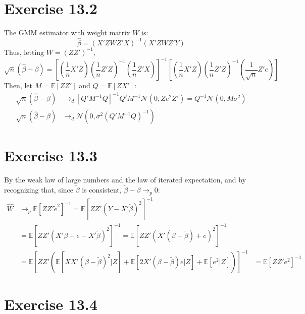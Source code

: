\documentclass{article}
\newcommand{\N}{\mathcal{N}}
\renewcommand{\tilde}[1]{\widetilde{#1}}
\newcommand{\tb}{\tilde{\beta}}
\newcommand{\bhat}{\hat{\beta}}
\newcommand{\E}[1]{\mathbb{E}\left[#1\right]}%
\begin{document}
\pagebreak
\section*{Exercise 13.2}
The GMM estimator with weight matrix $W$ is:
\[
	\bhat = \left(X'ZWZ'X\right)^{-1}\left(X'ZWZ'Y\right)
\]
Thus, letting $W=\left(ZZ'\right)^{-1}$, 
\[
	\sqrt{n}\left(\bhat-\beta\right) = \left[\left(\frac{1}{n}X'Z\right)\left(\frac{1}{n}Z'Z\right)^{-1}\left(\frac{1}{n}Z'X\right)\right]^{-1}\left[\left(\frac{1}{n}X'Z\right)\left(\frac{1}{n}Z'Z\right)^{-1}\left(\frac{1}{\sqrt{n}}Z'e\right)\right]	
\]
Then, let $M=\E{ZZ'}$ and ${Q=\E{ZX'}}$:
\begin{align*}
	\sqrt{n}\left(\bhat-\beta\right)	&\rightarrow_d  \left[Q'M^{-1}Q\right]^{-1}Q'M^{-1}\N\left(0,Ze^2Z'\right) = Q^{-1}\N\left(0,M\sigma^2\right)	\\
	\sqrt{n}\left(\bhat-\beta\right)	&\rightarrow_d   \N\left(0,\sigma^2(Q'M^{-1}Q)^{-1}\right)	
\end{align*}


\section*{Exercise 13.3}
By the weak law of large numbers and the law of iterated expectation, and by recognizing that, since $\tb$ is consistent, ${\tb-\beta\rightarrow_p0}$:
\begin{align*}
	\hat{W} &\rightarrow_p 	\E{ZZ'\tilde{e}^2}^{-1} 			= \E{ZZ'(Y-X'\tb)^2}^{-1}							\\
			&=				\E{ZZ'(X'\beta + e -X'\tb)^2}^{-1} 	= \E{ZZ'(X'(\beta-\tb) + e )^2}^{-1}				\\
			&=				\E{ZZ'\left(\E{XX'(\beta-\tb)^2|Z} + \E{2X'(\beta-\tb)e|Z} + \E{e^2|Z}\right)}^{-1}
			&=				\E{ZZ'e^2}^{-1}
\end{align*}


\section*{Exercise 13.4}
\end{document}
